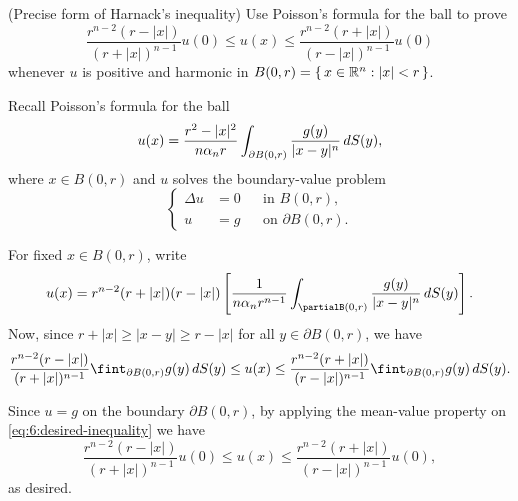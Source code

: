 \begin{problem}
  (Precise form of Harnack's inequality) Use Poisson's formula for the ball
  to prove
  \[
    \frac{r^{n-2}(r-|x|)}{(r+|x|)^{n-1}}u(0)%
    \leq u(x)%
    \leq \frac{r^{n-2}(r+|x|)}{(r-|x|)^{n-1}}u(0)
  \]
  whenever \(u\) is positive and harmonic in
  \(B(0,r)=\{\,x\in\mathbb{R}^n:|x|<r\,\}\).
\end{problem}
\begin{solution*}
  Recall Poisson's formula for the ball
  \begin{equation}
    \label{eq:6:poissons-formula}
    u(x)=\frac{r^2-|x|^2}{n\alpha_nr}
    \int_{\partial B(0,r)}\frac{g(y)}{|x-y|^n}\mathop{}\!d S(y),
  \end{equation}
  where \(x\in B(0,r)\) and \(u\) solves the boundary-value problem
  \[
    \left\{
      \begin{aligned}
        \Delta u&=0&&\text{in \(B(0,r)\),}\\
        u&=g&&\text{on \(\partial B(0,r)\).}
      \end{aligned}
    \right.
  \]

  For fixed \(x\in B(0,r)\), write
  \[
    u(x)=r^{n-2}(r+|x|)(r-|x|)%
    \left[%
      \frac{1}{n\alpha_n r^{n-1}} \int_{\partial%
        B(0,r)}\frac{g(y)}{|x-y|^n}\diff S(y)%
    \right]%
    .
  \]
  Now, since \(r+|x|\geq |x-y|\geq r-|x|\) for all \(y\in\partial B(0,r)\),
  we have
  \begin{equation}
    \label{eq:6:desired-inequality}
    \frac{r^{n-2}(r-|x|)}{(r+|x|)^{n-1}}\fint_{\partial
      B(0,r)}g(y)\diff S(y)\leq u(x)
    \leq\frac{r^{n-2}(r+|x|)}{(r-|x|)^{n-1}}\fint_{\partial
      B(0,r)}g(y)\diff S(y).
  \end{equation}

  Since \(u=g\) on the boundary \(\partial B(0,r)\), by applying the
  mean-value property on \eqref{eq:6:desired-inequality} we have
  \[
    \frac{r^{n-2}(r-|x|)}{(r+|x|)^{n-1}}u(0)\leq
    u(x)\leq
    \frac{r^{n-2}(r+|x|)}{(r-|x|)^{n-1}}u(0),
  \]
  as desired.
\end{solution*}

